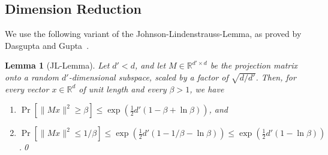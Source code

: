 \documentclass[a4paper,11pt]{paper}
\newcommand{\mathset}[1]{\ensuremath {\mathbb {#1}}}
\newcommand{\R}{\mathset{R}}
\newtheorem{lemma}[theorem]{Lemma}
\begin{document}
\subsection{Dimension Reduction}\label{sec:dimReduct}

We use the following variant of the Johnson-Lindenstrauss-Lemma,
as proved by Dasgupta and Gupta~\cite[Lemma~2.2]{DasguptaGu03}.

\begin{lemma}[JL-Lemma]\label{lem:jl}
  Let $d' < d$, and let $M \in \R^{d'\times d}$ be the projection
  matrix onto a random $d'$-dimensional subspace, scaled by a factor
  of $\sqrt{d/d'}$.
  Then, for every vector $x \in \R^d$ of unit length and every
  $\beta > 1$, we have
  \begin{enumerate}
    \item\label{itm:jl-up}
      $\Pr\left[\|Mx\|^2 \geq \beta\right] \leq
      \exp\left(\tfrac{1}{2}d'  (1 - \beta + \ln \beta)\right)$, and
    \item\label{itm:jl-low}
      $\Pr\left[\|Mx\|^2 \leq 1/\beta\right] \leq
      \exp\left(\tfrac{1}{2}d'(1 - 1/\beta - \ln \beta)\right)
      \leq \exp\left(\tfrac{1}{2}d'(1 - \ln \beta)\right)$.\qed{}
  \end{enumerate}
\end{lemma}
\end{document}
